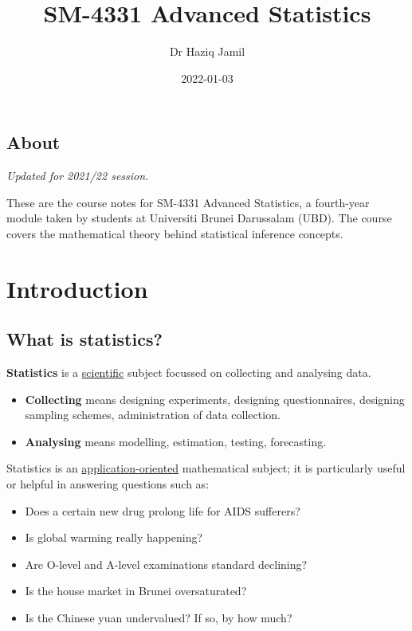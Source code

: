 \documentclass[
]{book}
\title{SM-4331 Advanced Statistics}
\author{Dr Haziq Jamil}
\date{2022-01-03}
\providecommand{\tightlist}{%
  \setlength{\itemsep}{0pt}\setlength{\parskip}{0pt}}
\theoremstyle{definition}
\theoremstyle{definition}
\theoremstyle{definition}
\theoremstyle{definition}
\theoremstyle{remark}
\begin{document}
\maketitle

{
\setcounter{tocdepth}{1}
\tableofcontents
}
\hypertarget{about}{%
\chapter*{About}\label{about}}

\emph{Updated for 2021/22 session.}

These are the course notes for SM-4331 Advanced Statistics, a fourth-year module taken by students at Universiti Brunei Darussalam (UBD).
The course covers the mathematical theory behind statistical inference concepts.

\hypertarget{part-introduction}{%
\part{Introduction}\label{part-introduction}}

\hypertarget{what-is-statistics}{%
\chapter*{What is statistics?}\label{what-is-statistics}}

\textbf{Statistics} is a \uline{scientific} subject focussed on collecting and analysing data.

\begin{itemize}
\tightlist
\item
  \textbf{Collecting} means designing experiments, designing
  questionnaires, designing sampling schemes, administration of data
  collection.
\item
  \textbf{Analysing} means modelling, estimation, testing, forecasting.
\end{itemize}

Statistics is an \uline{application-oriented} mathematical subject; it is
particularly useful or helpful in answering questions such as:

\begin{itemize}
\tightlist
\item
  Does a certain new drug prolong life for AIDS sufferers?
\item
  Is global warming really happening?
\item
  Are O-level and A-level examinations standard declining?
\item
  Is the house market in Brunei oversaturated?
\item
  Is the Chinese yuan undervalued? If so, by how much?
\end{itemize}
\end{document}
